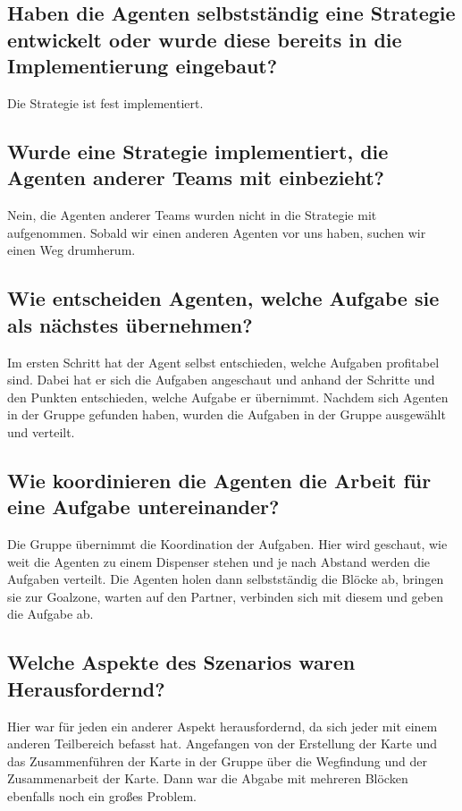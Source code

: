 \subsection{Haben die Agenten selbstständig eine Strategie entwickelt oder wurde diese bereits in die Implementierung eingebaut?}
Die Strategie ist fest implementiert.

\subsection{Wurde eine Strategie implementiert, die Agenten anderer Teams mit einbezieht?}
Nein, die Agenten anderer Teams wurden nicht in die Strategie mit aufgenommen. Sobald wir einen anderen Agenten vor uns haben, suchen wir einen Weg drumherum.

\subsection{Wie entscheiden Agenten, welche Aufgabe sie als nächstes übernehmen?}
Im ersten Schritt hat der Agent selbst entschieden, welche Aufgaben profitabel sind. Dabei hat er sich die Aufgaben angeschaut und anhand der Schritte und den Punkten entschieden, welche Aufgabe er übernimmt. Nachdem sich Agenten in der Gruppe gefunden haben, wurden die Aufgaben in der Gruppe ausgewählt und verteilt.

\subsection{Wie koordinieren die Agenten die Arbeit für eine Aufgabe untereinander?}
Die Gruppe übernimmt die Koordination der Aufgaben. Hier wird geschaut, wie weit die Agenten zu einem Dispenser stehen und je nach Abstand werden die Aufgaben verteilt. Die Agenten holen dann selbstständig die Blöcke ab, bringen sie zur Goalzone, warten auf den Partner, verbinden sich mit diesem und geben die Aufgabe ab.

\subsection{Welche Aspekte des Szenarios waren Herausfordernd?}
Hier war für jeden ein anderer Aspekt herausfordernd, da sich jeder mit einem anderen Teilbereich befasst hat. Angefangen von der Erstellung der Karte und das Zusammenführen der Karte in der Gruppe über die Wegfindung und der Zusammenarbeit der Karte. Dann war die Abgabe mit mehreren Blöcken ebenfalls noch ein großes Problem.

